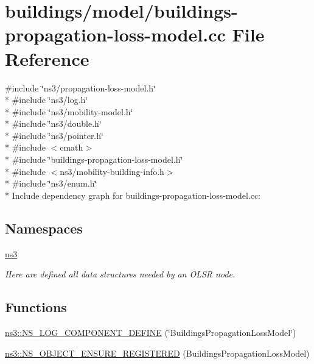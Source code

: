 \hypertarget{buildings-propagation-loss-model_8cc}{}\section{buildings/model/buildings-\/propagation-\/loss-\/model.cc File Reference}
\label{buildings-propagation-loss-model_8cc}
{\ttfamily \#include \char`\"{}ns3/propagation-\/loss-\/model.\+h\char`\"{}}\\*
{\ttfamily \#include \char`\"{}ns3/log.\+h\char`\"{}}\\*
{\ttfamily \#include \char`\"{}ns3/mobility-\/model.\+h\char`\"{}}\\*
{\ttfamily \#include \char`\"{}ns3/double.\+h\char`\"{}}\\*
{\ttfamily \#include \char`\"{}ns3/pointer.\+h\char`\"{}}\\*
{\ttfamily \#include $<$cmath$>$}\\*
{\ttfamily \#include \char`\"{}buildings-\/propagation-\/loss-\/model.\+h\char`\"{}}\\*
{\ttfamily \#include $<$ns3/mobility-\/building-\/info.\+h$>$}\\*
{\ttfamily \#include \char`\"{}ns3/enum.\+h\char`\"{}}\\*
Include dependency graph for buildings-\/propagation-\/loss-\/model.cc\+:
\subsection*{Namespaces}
\begin{DoxyCompactItemize}
\item 
 \hyperlink{namespacens3}{ns3}
\begin{DoxyCompactList}\small\item\em Here are defined all data structures needed by an O\+L\+SR node. \end{DoxyCompactList}\end{DoxyCompactItemize}
\subsection*{Functions}
\begin{DoxyCompactItemize}
\item 
\hyperlink{namespacens3_ad7099b3b118a7f4a506e0d4dd7ed2d6d}{ns3\+::\+N\+S\+\_\+\+L\+O\+G\+\_\+\+C\+O\+M\+P\+O\+N\+E\+N\+T\+\_\+\+D\+E\+F\+I\+NE} (\char`\"{}Buildings\+Propagation\+Loss\+Model\char`\"{})
\item 
\hyperlink{namespacens3_ab107eb540b7950cff45fabdd9cb8356c}{ns3\+::\+N\+S\+\_\+\+O\+B\+J\+E\+C\+T\+\_\+\+E\+N\+S\+U\+R\+E\+\_\+\+R\+E\+G\+I\+S\+T\+E\+R\+ED} (Buildings\+Propagation\+Loss\+Model)
\end{DoxyCompactItemize}
